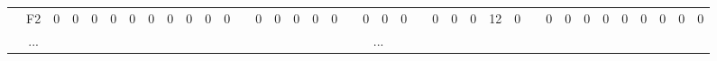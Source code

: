 \documentclass[12pt]{article}
\begin{document}
\begin{table}[!ht]
{\begin{tabular}{cccccccccccccccccccccccccccccccccccccc}
\multicolumn{1}{c|}{}                       & \multicolumn{1}{c|}{F2}  & \multicolumn{1}{c|}{0}  & \multicolumn{1}{c|}{0}  & \multicolumn{1}{c|}{0}  & \multicolumn{1}{c|}{0}  & \multicolumn{1}{c|}{0}  & \multicolumn{1}{c|}{0}  & \multicolumn{1}{c|}{0}  & \multicolumn{1}{c|}{0}  & \multicolumn{1}{c|}{0}  & \multicolumn{1}{c|}{0}  & \multicolumn{1}{c|}{}                     & \multicolumn{1}{c|}{0}  & \multicolumn{1}{c|}{0}  & \multicolumn{1}{c|}{0}  & \multicolumn{1}{c|}{0}  & \multicolumn{1}{c|}{0}  & \multicolumn{1}{c|}{}                     & \multicolumn{1}{c|}{0}  & \multicolumn{1}{c|}{0}  & \multicolumn{1}{c|}{0}  & \multicolumn{1}{c|}{}                     & \multicolumn{1}{c|}{0}  & \multicolumn{1}{c|}{0}  & \multicolumn{1}{c|}{0}  & \multicolumn{1}{c|}{12} & \multicolumn{1}{c|}{0}  & \multicolumn{1}{c|}{}                     & \multicolumn{1}{c|}{0}  & \multicolumn{1}{c|}{0}  & \multicolumn{1}{c|}{0}  & \multicolumn{1}{c|}{0}  & \multicolumn{1}{c|}{0}  & \multicolumn{1}{c|}{0}  & \multicolumn{1}{c|}{0}  & \multicolumn{1}{c|}{0}  & \multicolumn{1}{c|}{0}  \\ \cline{2-12} \cline{14-18} \cline{20-22} \cline{24-28} \cline{30-38} 
\multicolumn{1}{c|}{}                       & \multicolumn{1}{c|}{...} & \multicolumn{36}{c|}{...}                                                                                                                                                                                                                                                                                                                                                                                                                                                                                                                                                                                                                                                                                                                                                                                                                                                                                                                                                                                                                     \\ \cline{2-12} \cline{14-18} \cline{20-22} \cline{24-28} \cline{30-38} 

\end{tabular}}
\end{table}
\end{document}
